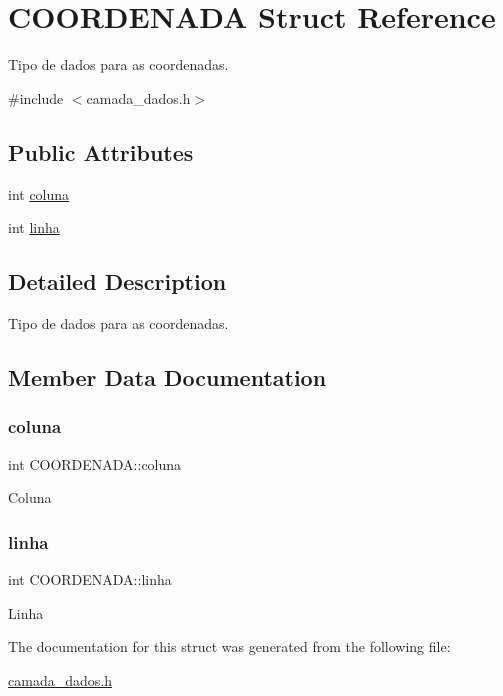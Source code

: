 \hypertarget{struct_c_o_o_r_d_e_n_a_d_a}{}\section{C\+O\+O\+R\+D\+E\+N\+A\+DA Struct Reference}
\label{struct_c_o_o_r_d_e_n_a_d_a}


Tipo de dados para as coordenadas.  




{\ttfamily \#include $<$camada\+\_\+dados.\+h$>$}

\subsection*{Public Attributes}
\begin{DoxyCompactItemize}
\item 
int \hyperlink{struct_c_o_o_r_d_e_n_a_d_a_adfbc8d4856ce807139fdf62e00aed29a}{coluna}
\item 
int \hyperlink{struct_c_o_o_r_d_e_n_a_d_a_aefe14bcc5a066ac3b21500cc3d28c06f}{linha}
\end{DoxyCompactItemize}


\subsection{Detailed Description}
Tipo de dados para as coordenadas. 

\subsection{Member Data Documentation}
\mbox{\label{struct_c_o_o_r_d_e_n_a_d_a_adfbc8d4856ce807139fdf62e00aed29a}} 
\subsubsection{\texorpdfstring{coluna}{coluna}}
{\footnotesize\ttfamily int C\+O\+O\+R\+D\+E\+N\+A\+D\+A\+::coluna}

Coluna \mbox{\label{struct_c_o_o_r_d_e_n_a_d_a_aefe14bcc5a066ac3b21500cc3d28c06f}} 
\subsubsection{\texorpdfstring{linha}{linha}}
{\footnotesize\ttfamily int C\+O\+O\+R\+D\+E\+N\+A\+D\+A\+::linha}

Linha 

The documentation for this struct was generated from the following file\+:\begin{DoxyCompactItemize}
\item 
\hyperlink{camada__dados_8h}{camada\+\_\+dados.\+h}\end{DoxyCompactItemize}
